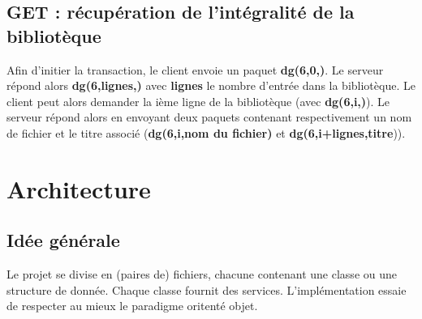 \documentclass[10pt,a4paper]{article}
\begin{document}
\subsection{GET : récupération de l'intégralité de la bibliotèque}
Afin d'initier la transaction, le client envoie un paquet \textbf{dg(6,0,)}.
Le serveur répond alors \textbf{dg(6,lignes,)} avec \textbf{lignes} le nombre d'entrée dans la bibliotèque.
Le client peut alors demander la ième ligne de la bibliotèque (avec \textbf{dg(6,i,)}). Le serveur répond alors en envoyant deux paquets contenant respectivement un nom de fichier et le titre associé (\textbf{dg(6,i,nom du fichier)} et \textbf{dg(6,i+lignes,titre})).

\newpage

\section{Architecture}
\subsection{Idée générale}
Le projet se divise en (paires de) fichiers, chacune contenant une classe ou une structure de donnée. Chaque classe fournit des services. L'implémentation essaie de respecter au mieux le paradigme oritenté objet.
\end{document}
